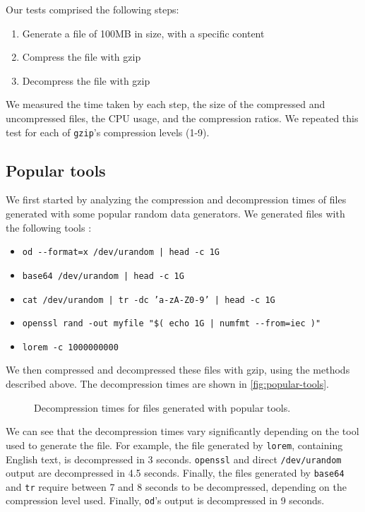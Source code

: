 \documentclass[a4paper,10pt,compsoc,conference]{IEEEtran}
\begin{document}
Our tests comprised the following steps:

\begin{enumerate}
\item Generate a file of 100MB in size, with a specific content
\item Compress the file with gzip
\item Decompress the file with gzip
\end{enumerate}

We measured the time taken by each step, the size of the compressed and
uncompressed files, the CPU usage, and the compression ratios. We repeated
this test for each of \texttt{gzip}'s compression levels (1-9). 

\subsection{Popular tools}
\label{sec:orga0e3bd6}

We first started by analyzing the compression and decompression times of
files generated with some popular random data generators. We generated files
with the following tools \citep{strandbergLorem2022}:

\begin{itemize}
\item \texttt{od -{}-format=x /dev/urandom | head -c 1G}
\item \texttt{base64 /dev/urandom | head -c 1G}
\item \texttt{cat /dev/urandom | tr -dc 'a-zA-Z0-9' | head -c 1G}
\item \texttt{openssl rand -out myfile "\$( echo 1G | numfmt -{}-from=iec )"}
\item \texttt{lorem -c 1000000000}
\end{itemize}

We then compressed and decompressed these files with gzip, using the methods
described above. The decompression times are shown in \autoref{fig:popular-tools}.

\begin{figure}
  \begin{center}
    
  \end{center}
  \caption{Decompression times for files generated with popular tools.}
  \label{fig:popular-tools}
\end{figure}

We can see that the decompression times vary significantly
depending on the tool used to generate the file. For example, the file
generated by \texttt{lorem}, containing English text, is decompressed in 3 seconds.
\texttt{openssl} and direct \texttt{/dev/urandom} output are decompressed in 4.5 seconds.
Finally, the files generated by \texttt{base64} and \texttt{tr} require between 7 and 8
seconds to be decompressed, depending on the compression level used. Finally,
\texttt{od}'s output is decompressed in 9 seconds. 
\end{document}
